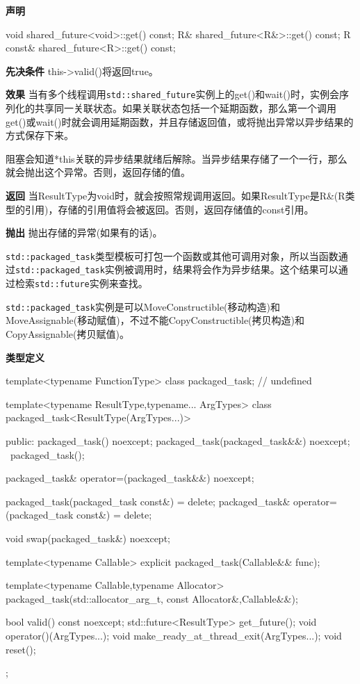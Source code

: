 \textbf{声明}

\begin{cpp}
void shared_future<void>::get() const;
R& shared_future<R&>::get() const;
R const& shared_future<R>::get() const;
\end{cpp}

\textbf{先决条件}
this->valid()将返回true。

\textbf{效果}
当有多个线程调用\texttt{std::shared\_future}实例上的get()和wait()时，实例会序列化的共享同一关联状态。如果关联状态包括一个延期函数，那么第一个调用get()或wait()时就会调用延期函数，并且存储返回值，或将抛出异常以异步结果的方式保存下来。

阻塞会知道*this关联的异步结果就绪后解除。当异步结果存储了一个一行，那么就会抛出这个异常。否则，返回存储的值。

\textbf{返回}
当ResultType为void时，就会按照常规调用返回。如果ResultType是R\&(R类型的引用)，存储的引用值将会被返回。否则，返回存储值的const引用。

\textbf{抛出}
抛出存储的异常(如果有的话)。


\texttt{std::packaged\_task}类型模板可打包一个函数或其他可调用对象，所以当函数通过\texttt{std::packaged\_task}实例被调用时，结果将会作为异步结果。这个结果可以通过检索\texttt{std::future}实例来查找。

\texttt{std::packaged\_task}实例是可以MoveConstructible(移动构造)和MoveAssignable(移动赋值)，不过不能CopyConstructible(拷贝构造)和CopyAssignable(拷贝赋值)。

\textbf{类型定义}

\begin{cpp}
template<typename FunctionType>
class packaged_task; // undefined

template<typename ResultType,typename... ArgTypes>
class packaged_task<ResultType(ArgTypes...)>
{
public:
  packaged_task() noexcept;
  packaged_task(packaged_task&&) noexcept;
  ~packaged_task();

  packaged_task& operator=(packaged_task&&) noexcept;

  packaged_task(packaged_task const&) = delete;
  packaged_task& operator=(packaged_task const&) = delete;

  void swap(packaged_task&) noexcept;

  template<typename Callable>
  explicit packaged_task(Callable&& func);

  template<typename Callable,typename Allocator>
  packaged_task(std::allocator_arg_t, const Allocator&,Callable&&);

  bool valid() const noexcept;
  std::future<ResultType> get_future();
  void operator()(ArgTypes...);
  void make_ready_at_thread_exit(ArgTypes...);
  void reset();
};
\end{cpp}

